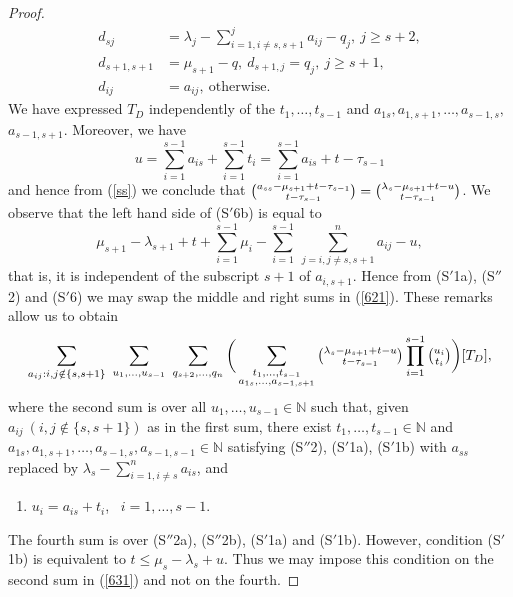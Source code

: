 \documentclass[ALCO,Unicode]{cedram}
\newcommand{\m}{\mu}
\numberwithin{equation}{section}
\begin{document}
\begin{proof}
\begin{align}
	d_{sj}&=\lambda_j-\sum_{i=1, i\neq s,s+1}^{j} a_{ij}-q_j, \ j \ge s+2,\\\nonumber
	d_{s+1,s+1}&=\mu_{s+1}-q, \  d_{s+1,j}=q_j, \  j \ge s+1,\\\nonumber
d_{ij}&=a_{ij}, \  \text{otherwise}.
	\end{align}		
We have expressed $T_D$ independently of the $t_1,\dots,t_{s-1}$ and $a_{1s},a_{1,s+1},\dots,a_{s-1,s},$ $ a_{s-1,s+1}$. Moreover, we have \[u=\sum_{i=1}^{s-1}a_{is} +\sum_{i=1}^{s-1}t_i=\sum_{i=1}^{s-1}a_{is} +t-\tau_{s-1}\] and hence from (\ref{ss}) we conclude that $\tbinom{a_{ss}-\m_{s+1}+t-\tau_{s-1}}{t-\tau_{s-1}}=\tbinom{\lambda_s -\mu_{s+1}+t-u}{t-\tau_{s-1}}$. We observe that the left hand side of (S$'$6b) is equal to \[\mu_{s+1}-\lambda_{s+1}+t+\sum_{i=1}^{s-1}\mu_i -\sum_{i=1}^{s-1}\  \sum_{j=i, j \neq s, s+1}^{n}a_{ij} -u,\] that is, it is independent of the subscript $s+1$ of $a_{i,s+1}$. Hence from (S$'$1a), (S$''$2) and (S$'$6) we may swap the middle and right sums in (\ref{621}). These remarks allow us to obtain
\begin{equation}\label{631}
	\sum_{a_{ij}: i,j \notin \{s, s+1\}} \ \sum_{u_1,\dots,u_{s-1}} \  \sum_{q_{s+2},\dots,q_{n}} \bigg( \sum_{\substack{t_1,\dots,t_{s-1}\\a_{1s},\dots,a_{s-1,s+1}}}      \tbinom{\lambda_s -\mu_{s+1}+t-u}{t-\tau_{s-1}}\prod_{i=1}^{s-1}\tbinom{u_i}{t_i} \bigg) [T_D], \end{equation}
where the second sum is over all $u_1,\dots,u_{s-1} \in \mathbb{N}$ such that, given $a_{ij} \  (i,j \notin \{s, s+1\})$ as in the first sum,  there exist $t_1,\ldots,t_{s-1} \in \mathbb{N}$ and $ a_{1s}, a_{1,s+1},\dots,a_{s-1,s}, a_{s-1,s-1} \in \mathbb{N}$ satisfying (S$''$2), (S$'$1a), (S$'$1b) with $a_{ss}$ replaced by $\lambda_s- \sum_{i=1, i \neq s}^{n}a_{is}$, and
\begin{enumerate}
	\item[(S$''$3)] $u_i=a_{is}+t_i$, \  $i=1,\dots,s-1$.
\end{enumerate}
The fourth sum is over (S$''$2a), (S$''$2b), (S$'$1a) and (S$'$1b). However, condition (S$'$1b) is equivalent to $t \le \mu_s -\lambda_s +u$. Thus we may impose this condition on the second sum in (\ref{631}) and not on the fourth.


\end{proof}
\end{document}
